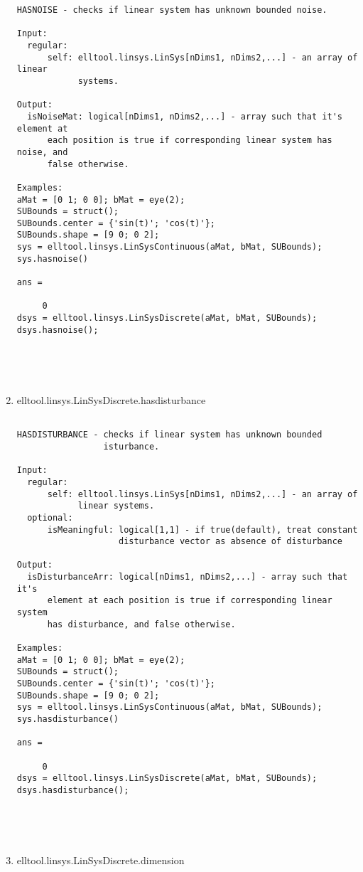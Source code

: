 \begin{enumerate}
\begin{lstlisting}
HASNOISE - checks if linear system has unknown bounded noise.

Input:
  regular:
      self: elltool.linsys.LinSys[nDims1, nDims2,...] - an array of linear
            systems.

Output:
  isNoiseMat: logical[nDims1, nDims2,...] - array such that it's element at
      each position is true if corresponding linear system has noise, and
      false otherwise.

Examples:
aMat = [0 1; 0 0]; bMat = eye(2);
SUBounds = struct();
SUBounds.center = {'sin(t)'; 'cos(t)'};
SUBounds.shape = [9 0; 0 2];
sys = elltool.linsys.LinSysContinuous(aMat, bMat, SUBounds);
sys.hasnoise()

ans =

     0
dsys = elltool.linsys.LinSysDiscrete(aMat, bMat, SUBounds);
dsys.hasnoise();





\end{lstlisting}
\fontfamily{\familydefault}
\selectfont
\item {elltool.linsys.LinSysDiscrete.hasdisturbance}
\selectfont
\begin{lstlisting}

HASDISTURBANCE - checks if linear system has unknown bounded
                 isturbance.

Input:
  regular:
      self: elltool.linsys.LinSys[nDims1, nDims2,...] - an array of
            linear systems.
  optional:
      isMeaningful: logical[1,1] - if true(default), treat constant
                    disturbance vector as absence of disturbance

Output:
  isDisturbanceArr: logical[nDims1, nDims2,...] - array such that it's
      element at each position is true if corresponding linear system
      has disturbance, and false otherwise.

Examples:
aMat = [0 1; 0 0]; bMat = eye(2);
SUBounds = struct();
SUBounds.center = {'sin(t)'; 'cos(t)'};
SUBounds.shape = [9 0; 0 2];
sys = elltool.linsys.LinSysContinuous(aMat, bMat, SUBounds);
sys.hasdisturbance()

ans =

     0
dsys = elltool.linsys.LinSysDiscrete(aMat, bMat, SUBounds);
dsys.hasdisturbance();





\end{lstlisting}
\fontfamily{\familydefault}
\selectfont
\item {elltool.linsys.LinSysDiscrete.dimension}
\selectfont
\begin{lstlisting}


\end{lstlisting}
\end{enumerate}
